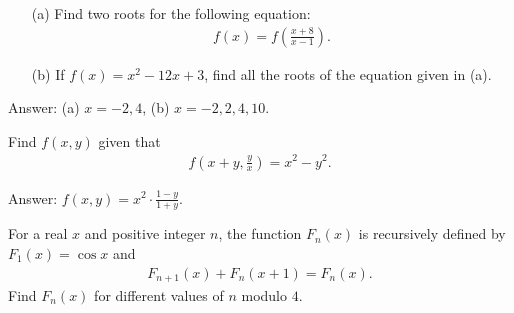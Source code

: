 \begin{tcolorbox}
\begin{question}
\begin{itemize}
    \item[(a)] Find two roots for the following equation:
    \begin{align*}
        f(x)=f\left(\frac{x+8}{x-1}\right).
    \end{align*}
    \item[(b)] If $f(x)=x^2-12x+3$, find all the roots of the equation given in (a).
\end{itemize}
\end{question}
\end{tcolorbox}

\begin{solution}[name=Solution by Parviz Shahriari]
Answer: (a) $x=-2, 4$, (b) $x=-2, 2, 4, 10$.
\end{solution}


\begin{tcolorbox}
\begin{question}
Find $f(x,y)$ given that
\begin{align*}
    f\left(x+y, \frac{y}{x}\right) = x^2 - y^2.
\end{align*}
\end{question}
\end{tcolorbox}

\begin{solution}[name=Solution by Parviz Shahriari]
Answer: $f(x,y)=x^2 \cdot \frac{1-y}{1+y}$.
\end{solution}



\begin{tcolorbox}
\begin{question}
For a real $x$ and positive integer $n$, the function $F_n(x)$ is recursively defined by $F_1(x)=\cos x$ and
\begin{align*}
    F_{n+1}(x) + F_n(x+1) = F_n(x).
\end{align*}
Find $F_n(x)$ for different values of $n$ modulo $4$.
\end{question}
\end{tcolorbox}

